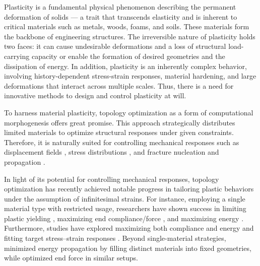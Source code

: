 \documentclass[preprint,11pt]{elsarticle}
\theoremstyle{definition}
\begin{document}
Plasticity is a fundamental physical phenomenon describing the permanent deformation of solids \citep{chaboche_review_2008} --- a trait that transcends elasticity and is inherent to critical materials such as metals, woods, foams, and soils. These materials form the backbone of engineering structures. The irreversible nature of plasticity holds two faces: it can cause undesirable deformations and a loss of structural load-carrying capacity or enable the formation of desired geometries and the dissipation of energy. In addition, plasticity is an inherently complex behavior, involving history-dependent stress-strain responses, material hardening, and large deformations that interact across multiple scales. Thus, there is a need for innovative methods to design and control plasticity at will.

To harness material plasticity, topology optimization \citep{bendsoe_generating_1988, bendsoe_topology_2003, wang_comprehensive_2021} as a form of computational morphogenesis offers great promise. This approach strategically distributes limited materials to optimize structural responses under given constraints. Therefore, it is naturally suited for controlling mechanical responses such as displacement fields \citep{jia_topology_2024, jia_unstructured_2024}, stress distributions \citep{jia_modulate_2024}, and fracture nucleation and propagation \citep{jia_controlling_2023}.

In light of its potential for controlling mechanical responses, topology optimization has recently achieved notable progress in tailoring plastic behaviors under the assumption of infinitesimal strains. For instance, employing a single material type with restricted usage, researchers have shown success in limiting plastic yielding \citep{amir_stress-constrained_2017, zhang_framework_2023, li_three-dimensional_2023}, maximizing end compliance/force \citep{boissier_elastoplastic_2021, desai_topology_2021}, and maximizing energy \citep{maute_adaptive_1998, zhang_topology_2017, li_topology_2017, li_design_2017, li_design_2017-1, alberdi_topology_2017, alberdi_design_2019}. Furthermore, studies have explored maximizing both compliance and energy \citep{abueidda_topology_2021} and fitting target stress--strain responses \citep{kim_microstructure_2020}. Beyond single-material strategies, \citet{nakshatrala_topology_2015} minimized energy propagation by filling distinct materials into fixed geometries, while \citet{li_topology_2021} optimized end force in similar setups.
\end{document}
